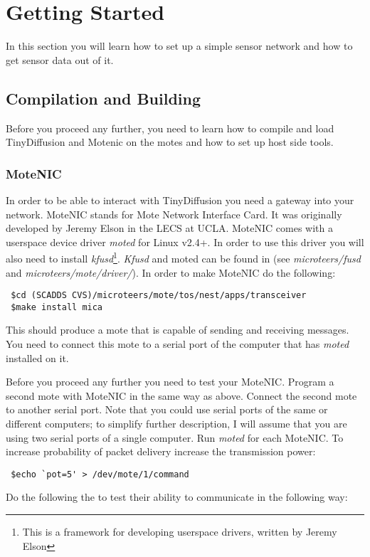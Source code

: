 \documentclass[11pt,onecolumn]{article}
\begin{document}
\section{Getting Started}
In this section you will learn how to set up a simple sensor
network and how to get sensor data out of it.

\subsection{Compilation and Building}
Before you proceed any further, you need to learn how to compile and
load TinyDiffusion and Motenic on the motes and how to set up host
side tools.

\subsubsection{\label{motenic}MoteNIC}
In order to be able to interact with TinyDiffusion you need a gateway
into your network. MoteNIC stands for Mote Network Interface Card. It
was originally developed by Jeremy Elson in the LECS at UCLA. MoteNIC
comes with a userspace device driver \emph{moted} for Linux v2.4+. In
order to use this driver you will also need to install
\emph{kfusd}\footnote{This is a framework for developing userspace
drivers, written by Jeremy Elson}. \emph{Kfusd} and moted can be found
in\cite{scadds} (see \emph{microteers/fusd} and
\emph{microteers/mote/driver/}).  In order to make MoteNIC do the
following:

\begin{verbatim}
 $cd (SCADDS CVS)/microteers/mote/tos/nest/apps/transceiver
 $make install mica
\end{verbatim}

This should produce a mote that is capable of sending and receiving
messages. You need to connect this mote to a serial port of
the computer that has \emph{moted} installed on it.

Before you proceed any further you need to test your MoteNIC. Program
a second mote with MoteNIC in the same way as above. Connect the
second mote to another serial port. Note that you could use serial
ports of the same or different computers; to simplify further
description, I will assume that you are using two serial ports of a
single computer. Run \emph{moted} for each MoteNIC. To increase
probability of packet delivery increase the transmission power:
\begin{verbatim}
 $echo `pot=5' > /dev/mote/1/command
\end{verbatim}
Do the following the to test their
ability to communicate in the following way:
\end{document}
